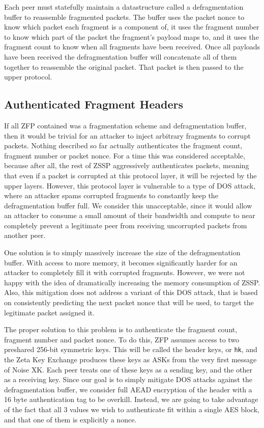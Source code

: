 \documentclass{article}
\begin{document}
Each peer must statefully maintain a datastructure called a defragmentation buffer to reassemble fragmented packets. The buffer uses the packet nonce to know which packet each fragment is a component of, it uses the fragment number to know which part of the packet the fragment's payload maps to, and it uses the fragment count to know when all fragments have been received. Once all payloads have been received the defragmentation buffer will concatenate all of them together to reassemble the original packet. That packet is then passed to the upper protocol.

\subsection{Authenticated Fragment Headers}\label{sec:header}

If all ZFP contained was a fragmentation scheme and defragmentation buffer, then it would be trivial for an attacker to inject arbitrary fragments to corrupt packets. Nothing described so far actually authenticates the fragment count, fragment number or packet nonce. For a time this was considered acceptable, because after all, the rest of ZSSP aggressively authenticates packets, meaning that even if a packet is corrupted at this protocol layer, it will be rejected by the upper layers. However, this protocol layer is vulnerable to a type of DOS attack, where an attacker spams corrupted fragments to constantly keep the defragmentation buffer full. We consider this unacceptable, since it would allow an attacker to consume a small amount of their bandwidth and compute to near completely prevent a legitimate peer from receiving uncorrupted packets from another peer.

One solution is to simply massively increase the size of the defragmentation buffer. With access to more memory, it becomes significantly harder for an attacker to completely fill it with corrupted fragments. However, we were not happy with the idea of dramatically increasing the memory consumption of ZSSP. Also, this mitigation does not address a variant of this DOS attack, that is based on consistently predicting the next packet nonce that will be used, to target the legitimate packet assigned it.

The proper solution to this problem is to authenticate the fragment count, fragment number and packet nonce. To do this, ZFP assumes access to two preshared 256-bit symmetric keys. This will be called the header keys, or \texttt{hk}, and the Zeta Key Exchange produces these keys as ASKs from the very first message of Noise XK. Each peer treats one of these keys as a sending key, and the other as a receiving key. Since our goal is to simply mitigate DOS attacks against the defragmentation buffer, we consider full AEAD encryption of the header with a 16 byte authentication tag to be overkill. Instead, we are going to take advantage of the fact that all 3 values we wish to authenticate fit within a single AES block, and that one of them is explicitly a nonce.
\end{document}
